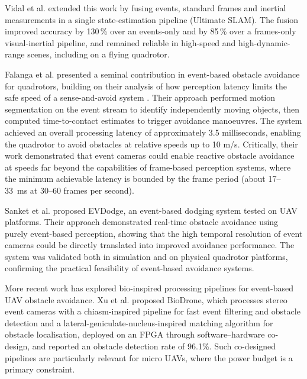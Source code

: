 \documentclass[11pt, a4paper]{report}
\begin{document}
Vidal et al. \cite{vidal2018ultimate} extended this work by fusing events, standard frames and inertial measurements in a single state-estimation pipeline (Ultimate SLAM). The fusion improved accuracy by 130\,\% over an events-only and by 85\,\% over a frames-only visual-inertial pipeline, and remained reliable in high-speed and high-dynamic-range scenes, including on a flying quadrotor. 

Falanga et al. \cite{falanga2020dynamic} presented a seminal contribution in event-based obstacle avoidance for quadrotors, building on their analysis of how perception latency limits the safe speed of a sense-and-avoid system \cite{falanga2019fast}. Their approach performed motion segmentation on the event stream to identify independently moving objects, then computed time-to-contact estimates to trigger avoidance manoeuvres. The system achieved an overall processing latency of approximately 3.5 milliseconds, enabling the quadrotor to avoid obstacles at relative speeds up to 10 m/s. Critically, their work demonstrated that event cameras could enable reactive obstacle avoidance at speeds far beyond the capabilities of frame-based perception systems, where the minimum achievable latency is bounded by the frame period (about 17--33~ms at 30--60 frames per second). 

Sanket et al. \cite{sanket2020evdodgenet} proposed EVDodge, an event-based dodging system tested on UAV platforms. Their approach demonstrated real-time obstacle avoidance using purely event-based perception, showing that the high temporal resolution of event cameras could be directly translated into improved avoidance performance. The system was validated both in simulation and on physical quadrotor platforms, confirming the practical feasibility of event-based avoidance systems. 

More recent work has explored bio-inspired processing pipelines for event-based UAV obstacle avoidance. Xu et al. \cite{li2024taming} proposed BioDrone, which processes stereo event cameras with a chiasm-inspired pipeline for fast event filtering and obstacle detection and a lateral-geniculate-nucleus-inspired matching algorithm for obstacle localisation, deployed on an FPGA through software--hardware co-design, and reported an obstacle detection rate of 96.1\%. Such co-designed pipelines are particularly relevant for micro UAVs, where the power budget is a primary constraint. 
\end{document}

